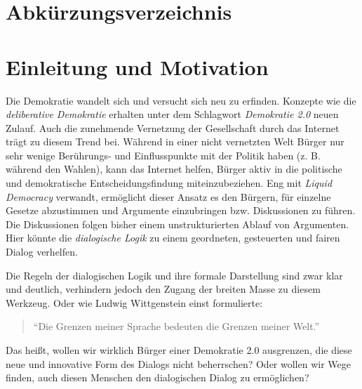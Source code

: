 \documentclass[11pt,a4paper,bibtotocnumbered]{scrreprt}
\begin{document}
\begin{singlespace}

\setcounter{page}{1}

\end{singlespace}


\tableofcontents
\listoffigures
\listoftables

\chapter*{Abkürzungsverzeichnis} 

\begin{acronym}[LAENGE]
\end{acronym}

\cleardoublepage





\chapter{Einleitung und Motivation} %

Die Demokratie wandelt sich und versucht sich neu zu erfinden. 
Konzepte wie die \emph{deliberative Demokratie} erhalten unter dem Schlagwort \emph{Demokratie 2.0} neuen Zulauf. 
Auch die zunehmende Vernetzung der Gesellschaft durch das Internet trägt zu diesem Trend bei. 
Während in einer nicht vernetzten Welt Bürger nur sehr wenige Berührungs- und Einflusspunkte mit der Politik haben (z. B. während den Wahlen), kann das Internet helfen, Bürger aktiv in die politische und demokratische Entscheidungsfindung miteinzubeziehen.
Eng mit \emph{Liquid Democracy} verwandt, ermöglicht dieser Ansatz es den Bürgern, für einzelne Gesetze abzustimmen und Argumente einzubringen bzw. Diskussionen zu führen.
Die Diskussionen folgen bisher einem unstrukturierten Ablauf von Argumenten.
Hier könnte die \emph{dialogische Logik} zu einem geordneten, gesteuerten und fairen Dialog verhelfen.

Die Regeln der dialogischen Logik und ihre formale Darstellung sind zwar klar und deutlich, verhindern jedoch den Zugang der breiten Masse zu diesem Werkzeug.
Oder wie Ludwig Wittgenstein einst formulierte:
\begin{quote}
\enquote{Die Grenzen meiner Sprache bedeuten die Grenzen meiner Welt.}
\end{quote}
Das heißt, wollen wir wirklich Bürger einer Demokratie 2.0 ausgrenzen, die diese neue und innovative Form des Dialogs nicht beherrschen? Oder wollen wir Wege finden, auch diesen Menschen den dialogischen Dialog zu ermöglichen?
\end{document}
